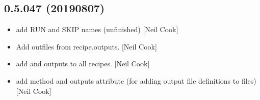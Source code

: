 \documentclass[a4paper,10pt,english]{report}
\begin{document}
\subsection{0.5.047 (2019\sphinxhyphen{}08\sphinxhyphen{}07)}
\label{\detokenize{misc/changelog:id114}}\begin{itemize}
\item {} 
 \sphinxhyphen{} add RUN and SKIP names (unfinished) {[}Neil Cook{]}

\item {} 
Add outfiles from recipe.outputs. {[}Neil Cook{]}

\item {} 
 \sphinxhyphen{} add  and outputs to all recipes.
{[}Neil Cook{]}

\item {} 
 \sphinxhyphen{} add  method and outputs attribute (for
adding output file definitions to files) {[}Neil Cook{]}

\end{itemize}
\end{document}
